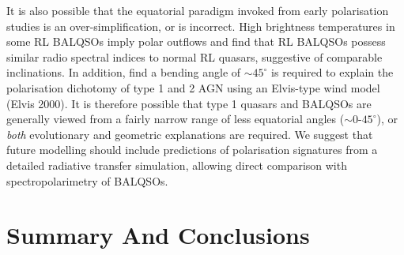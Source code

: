 \documentclass[useAMS,usenatbib]{mn2e_x}
\begin{document}
It is also possible that the equatorial paradigm invoked from early polarisation
studies \citep{goodrich1995, cohen1995,brotherton2006} 
is an over-simplification, or is incorrect. 
High brightness temperatures in some RL BALQSOs imply polar outflows \citep{zhou2006} 
and \cite{bruni2012} find that
RL BALQSOs possess similar radio spectral indices to normal RL quasars, 
suggestive of comparable inclinations. 
In addition, \cite{marin2013} find a bending angle of $\sim45^\circ$ is required to 
explain the polarisation dichotomy of type 1 and 2 AGN using an Elvis-type wind 
model (Elvis 2000). It is therefore possible 
that type 1 quasars and BALQSOs are generally viewed from a fairly narrow range of less
equatorial angles ($\sim0$-$45^\circ$), or {\em both} 
evolutionary and geometric explanations are required.
We suggest that future modelling should include predictions of polarisation signatures
from a detailed radiative transfer simulation, allowing direct 
comparison with spectropolarimetry of BALQSOs. 







\section{Summary And Conclusions}
\end{document}
